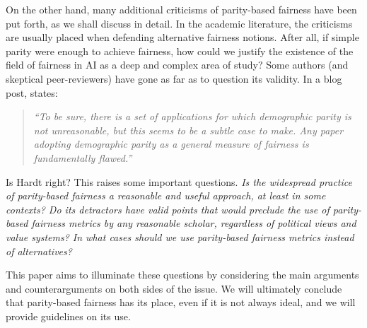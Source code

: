 \documentclass[11pt,dvipdfm]{article}
\begin{document}
On the other hand, many additional criticisms of parity-based fairness have been put forth, as we shall discuss in detail.  In the academic literature, the criticisms are usually placed when defending alternative fairness notions.  After all, if simple parity were enough to achieve fairness, how could we justify the existence of the field of fairness in AI as a deep and complex area of study?   Some authors (and skeptical peer-reviewers) have gone as far as to question its validity.  In a blog post, \cite{Hardt2016approaching} states:
\begin{quote}
    \emph{``To be sure, there is a set of applications for which demographic parity is not unreasonable, but this seems to be a subtle case to make. Any paper adopting demographic parity as a general measure of fairness is fundamentally flawed.''\cite{Hardt2016approaching}}
\end{quote}
Is Hardt right?  This raises some important questions.  \emph{Is the widespread practice of parity-based fairness a reasonable and useful approach, at least in some contexts?  Do its detractors have valid points that would preclude the use of parity-based fairness metrics by any reasonable scholar, regardless of political views and value systems?  In what cases should we use parity-based fairness metrics instead of alternatives?}

This paper aims to illuminate these questions by considering the main arguments and counterarguments on both sides of the issue.  We will ultimately conclude that parity-based fairness has its place, even if it is not always ideal, and we will provide guidelines on its use.
\end{document}
